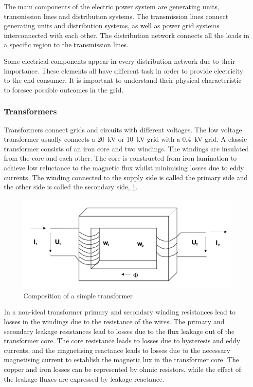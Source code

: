 The main components of the electric power system are generating units, transmission lines and distribution systems. The transmission lines connect generating units and distribution systems, as well as power grid systems interconnected with each other. The distribution network connects all the loads in a specific region to the transmission lines. 

Some electrical components appear in every distribution network due to their importance. These elements all have different task in order to provide electricity to the end consumer. It is important to understand their physical characteristic to foresee possible outcomes in the grid.  

\subsubsection{Transformers}

Transformers connect grids and circuits with different voltages. The low voltage transformer usually connects a 20~kV or 10~kV grid with a 0.4~kV grid. A classic transformer consists of an iron core and two windings. The windings are insulated from the core and each other. The core is constructed from iron lamination to achieve low reluctance to the magnetic flux whilst minimising losses due to eddy currents. The winding connected to the supply side is called the primary side and the other side is called the secondary side, \ref{fig:simpptrans}. 

\begin{figure}[ht]
    \centering
    \includegraphics[scale=0.7]{thesis-latex/img/simpletrans.PNG}
    \caption{Composition of a simple transformer}
    \label{fig:simpptrans}
\end{figure}

In a non-ideal transformer primary and secondary winding resistances lead to losses in the windings due to the resistance of the wires. The primary and secondary leakage resistances lead to losses due to the flux leakage out of the transformer core. The core resistance leads to losses due to hysteresis and eddy currents, and the magnetising reactance leads to losses due to the necessary magnetising current to establish the magnetic lux in the transformer core. The copper and iron losses can be represented by ohmic resistors, while the effect of the leakage fluxes are expressed by leakage reactance.

